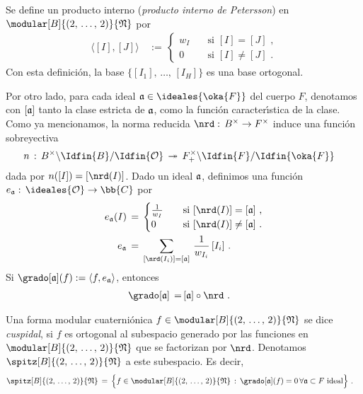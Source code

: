 Se define un producto interno (\emph{producto interno de Petersson}) en
$\modular[B]{(2,\,\dots,\,2)}{\frak{N}}$ por
\begin{align*}
	\langle [I],[J]\rangle & \,:=\,
	\begin{cases}
		w_{I} & \quad\text{si } [I] = [J]\text{ ,} \\
		0 & \quad\text{si } [I]\not = [J]\text{ .}
	\end{cases}
\end{align*}
%
Con esta definici\'{o}n, la base $\{[I_{1}],\,\dots,\,[I_{H}]\}$ es una base
ortogonal.

Por otro lado, para cada ideal $\frak{a}\in\ideales{\oka{F}}$ del cuerpo $F$,
denotamos con $[\frak{a}]$ tanto la clase estricta de $\frak{a}$, como la
funci\'{o}n caracter\'{\i}stica de la clase. Como ya mencionamos, la norma
reducida $\nrd:\,B^{\times}\rightarrow F^{\times}$ induce una funci\'{o}n
sobreyectiva
\begin{align*}
	n & \,:\, B^{\times}\backslash\Idfin{B}/\Idfin{\cal{O}}
		\,\twoheadrightarrow\,
		F_{+}^{\times}\backslash\Idfin{F}/\Idfin{\oka{F}}
\end{align*}
%
dada por $n([I])=[\nrd(I)]$. Dado un ideal $\frak{a}$, definimos una
funci\'{o}n $e_{\frak{a}}:\,\ideales{\cal{O}}\rightarrow\bb{C}$ por
\begin{align*}
	e_{\frak{a}}(I) & \,=\,
	\begin{cases}
		\frac{1}{w_{I}} & \quad\text{si } [\nrd(I)]=[\frak{a}]
								\text{ ,}\\
		0 & \quad\text{si } [\nrd(I)]\not =[\frak{a}] \text{ .}
	\end{cases} \\
	e_{\frak{a}} & \,=\, \sum_{[\nrd(I_{i})]=[\frak{a}]}\,
				\frac{1}{w_{I_{i}}}\,[I_{i}]
	\text{ .}
\end{align*}
%
Si $\grado[\frak{a}](f):=\langle f,e_{\frak{a}}\rangle$, entonces
\begin{align*}
	\grado[\frak{a}] \,=\, & [\frak{a}]\circ\nrd
	\text{ .}
\end{align*}
%

\begin{defFormaCuspidalDefinida}\label{def:formacuspidaldefinida}
	Una forma modular cuaterni\'{o}nica
	$f\in\modular[B]{(2,\,\dots,\,2)}{\frak{N}}$ se dice \emph{cuspidal},
	si $f$ es ortogonal al subespacio generado por las funciones en
	$\modular[B]{(2,\,\dots,\,2)}{\frak{N}}$ que se factorizan por $\nrd$.
	Denotamos $\spitz[B]{(2,\,\dots,\,2)}{\frak{N}}$ a este subespacio. Es
	decir,
	\begin{align*}
		\spitz[B]{(2,\,\dots,\,2)}{\frak{N}} & \,=\,
			\Big\{ f\in\modular[B]{(2,\,\dots,\,2)}{\frak{N}}
				\,:\,\grado[\frak{a}](f)
					=0\,\forall\frak{a}\subset F
					\text{ ideal}%
			\Big\}
		\text{ .}
	\end{align*}
\end{defFormaCuspidalDefinida}

